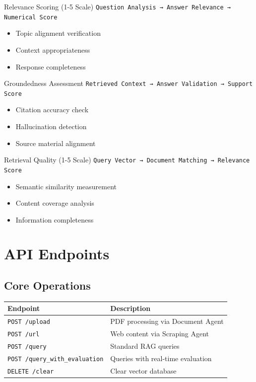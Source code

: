 \documentclass[12pt,a4paper]{article}
\newcommand{\endpoint}[2]{\texttt{#1} & #2 \\}
\begin{document}
\begin{infobox}{Relevance Scoring (1-5 Scale)}
\texttt{Question Analysis → Answer Relevance → Numerical Score}
\begin{itemize}
    \item Topic alignment verification
    \item Context appropriateness
    \item Response completeness
\end{itemize}
\end{infobox}

\begin{infobox}{Groundedness Assessment}
\texttt{Retrieved Context → Answer Validation → Support Score}
\begin{itemize}
    \item Citation accuracy check
    \item Hallucination detection
    \item Source material alignment
\end{itemize}
\end{infobox}

\begin{infobox}{Retrieval Quality (1-5 Scale)}
\texttt{Query Vector → Document Matching → Relevance Score}
\begin{itemize}
    \item Semantic similarity measurement
    \item Content coverage analysis
    \item Information completeness
\end{itemize}
\end{infobox}

\section{API Endpoints}

\subsection{Core Operations}
\begin{tabular}{|l|l|}
\hline
\textbf{Endpoint} & \textbf{Description} \\
\hline
\endpoint{POST /upload}{PDF processing via Document Agent}
\endpoint{POST /url}{Web content via Scraping Agent}
\endpoint{POST /query}{Standard RAG queries}
\endpoint{POST /query\_with\_evaluation}{Queries with real-time evaluation}
\endpoint{DELETE /clear}{Clear vector database}
\hline
\end{tabular}
\end{document}
